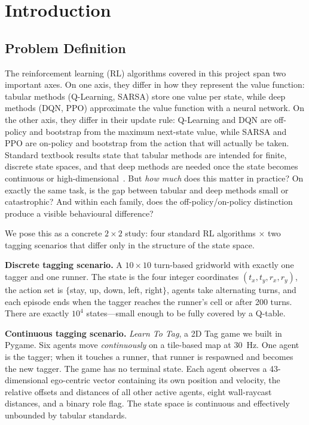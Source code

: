 \documentclass[conference]{IEEEtran}
\begin{document}
\section{Introduction}

\subsection{Problem Definition}

The reinforcement learning (RL) algorithms covered in this project span two
important axes. On one axis, they differ in how they represent the value
function: tabular methods (Q-Learning, SARSA) store one value per state,
while deep methods (DQN, PPO) approximate the value function with a neural
network. On the other axis, they differ in their update rule:
Q-Learning and DQN are off-policy and bootstrap from the maximum next-state
value, while SARSA and PPO are on-policy and bootstrap from the action that
will actually be taken. Standard textbook results state that tabular
methods are intended for finite, discrete state spaces, and that deep
methods are needed once the state becomes continuous or high-dimensional~\cite{sutton2018,mnih2015}.
But \emph{how much} does this matter in practice? On exactly the same task,
is the gap between tabular and deep methods small or catastrophic? And
within each family, does the off-policy/on-policy distinction produce a
visible behavioural difference?

We pose this as a concrete $2{\times}2$ study: four standard RL algorithms
$\times$ two tagging scenarios that differ only in the structure of the
state space.

\textbf{Discrete tagging scenario.} A $10{\times}10$ turn-based gridworld
with exactly one tagger and one runner. The state is the four integer
coordinates $(t_x, t_y, r_x, r_y)$, the action set is
$\{$stay, up, down, left, right$\}$, agents take alternating turns, and
each episode ends when the tagger reaches the runner's cell or after 200
turns. There are exactly $10^4$ states---small enough to be fully covered
by a Q-table.

\textbf{Continuous tagging scenario.} \textit{Learn To Tag}, a 2D Tag game
we built in Pygame. Six agents move \emph{continuously} on a tile-based
map at 30~Hz. One agent is the tagger; when it touches a runner, that
runner is respawned and becomes the new tagger. The game has no terminal
state. Each agent observes a 43-dimensional ego-centric vector containing
its own position and velocity, the relative offsets and distances of all
other active agents, eight wall-raycast distances, and a binary role flag.
The state space is continuous and effectively unbounded by tabular
standards.
\end{document}
